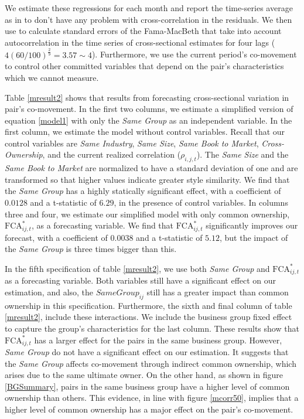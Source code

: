 \documentclass[12pt, a4paper]{article}
\begin{document}
We estimate these regressions for each month and report the time-series average as in \cite{FamaMacBeth} to don't have any problem with cross-correlation in the residuals. We then use  \cite{newey1987hypothesis} to calculate standard errors of the Fama-MacBeth that take into account autocorrelation in the time series of cross-sectional estimates for four lags ($ 4(60/100)^{\frac{2}{9}} = 3.57 \sim 4 $). Furthermore, we use the current period's co-movement to control other committed variables that depend on the pair's characteristics which we cannot measure. 

Table \ref{mresult2} shows that results from forecasting cross-sectional variation in pair's co-movement. In the first two columns, we estimate a simplified version of equation \ref{model1} with only the \textit{Same Group} as an independent variable. In the first column, we estimate the model without control variables. Recall that our control variables are \textit{Same Industry}, \textit{Same Size}, \textit{Same Book to Market}, \textit{Cross-Ownership}, and the current realized correlation ($\rho_{i,j,t}$). The \textit{Same Size} and the \textit{Same Book to Market} are normalized to have a standard deviation of one and are transformed so that higher values indicate greater style similarity. We find that the \textit{Same Group} has a highly statically significant effect, with a coefficient of $0.0128$ and a t-statistic of $6.29$, in the presence of control variables. 
In columns three and four, we estimate our simplified model with only common ownership, $\text{FCA}^*_{ij,t}$, as a forecasting variable. We find that $\text{FCA}^*_{ij,t}$ significantly improves our forecast, with a coefficient of $0.0038$ and a t-statistic of $5.12$, but the impact of the \textit{Same Group}   is three times bigger than this. 

In the fifth specification of table \ref{mresult2}, we use both \textit{Same Group}  and $\text{FCA}^*_{ij,t}$ as a forecasting variable. Both variables still have a significant effect on our estimation, and also, the $\textit{SameGroup}_{ij} $ still has a greater impact than common ownership in this specification. Furthermore, the sixth and final column of table \ref{mresult2}, include these interactions. We include the business group fixed effect to capture the group's characteristics for the last column. These results show that $\text{FCA}^*_{ij,t}$ has a larger effect for the pairs in the same business group. However, \textit{Same Group}  do not have a significant effect on our estimation. It suggests that the \textit{Same Group}  affects co-movement through indirect common ownership, which arises due to the same ultimate owner. On the other hand, as shown in figure \ref{BGSummary}, pairs in the same business group have a higher level of common ownership than others. This evidence, in line with figure \ref{mcorr50}, implies that a higher level of common ownership has a major effect on the pair's co-movement.
\end{document}
